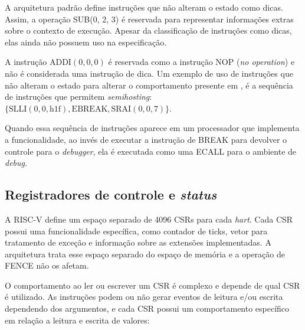   A arquitetura padrão define instruções que não alteram o estado como dicas.
  Assim, a operação SUB(0, 2, 3) é reservada para representar informações 
  extras sobre o contexto de execução.
  Apesar da classificação de instruções como dicas, elas ainda não possuem uso na especificação.

  A instrução ADDI$(0, 0, 0)$ é reservada como a instrução NOP (\emph{no operation}) e não é considerada
  uma instrução de dica.
  Um exemplo de uso de instruções que não alteram o estado para alterar o comportamento presente em \cite{RVS1},
  é a sequência de instruções que permitem \emph{semihosting}: $\{ \text{SLLI}(0, 0, \text{h1f}),  \text{EBREAK}, \text{SRAI}(0, 0, 7)\}$.

  Quando essa sequência de instruções aparece em um processador que implementa a funcionalidade,
  ao invés de executar a instrução de BREAK para devolver o controle para o \emph{debugger},
  ela é executada como uma ECALL para o ambiente de \emph{debug}.

\subsection{Registradores de controle e \emph{status}}
\label{sec:CSRs}

  A RISC-V define um espaço separado de 4096 CSRs para cada \emph{hart}. Cada CSR possui uma funcionalidade específica, como
  contador de ticks, vetor para tratamento de exceção e informação sobre as extensões implementadas. A arquitetura trata esse espaço
  separado do espaço de memória e a operação de FENCE não os afetam.

  O comportamento ao ler ou escrever um CSR é complexo e depende de qual CSR é utilizado. As instruções podem ou não gerar
  eventos de leitura e/ou escrita dependendo dos argumentos, e cada CSR possui um comportamento específico em relação a leitura
  e escrita de valores:

